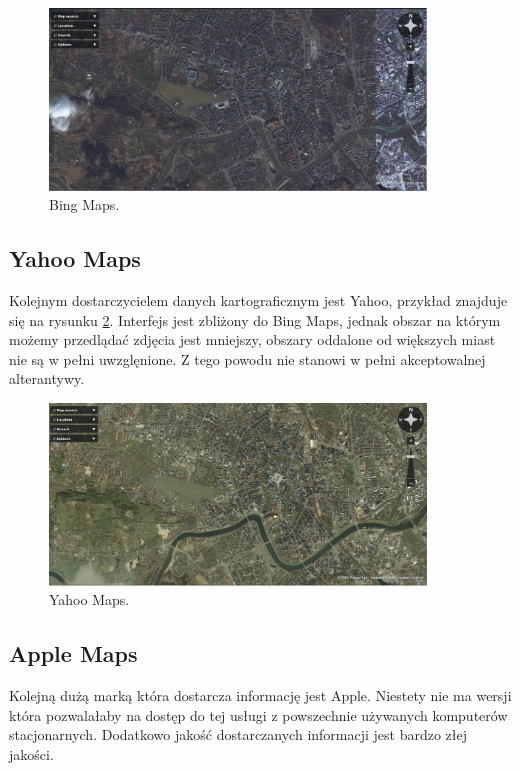 \begin{figure}[H]
  \centering
    \includegraphics[width=100mm]{ge/bing_1.jpg}
  \caption{Bing Maps.}
  \label{fig:bingMaps_1}
\end{figure}

\subsection{Yahoo Maps}
\label{subsec:Yahoo Maps}

Kolejnym dostarczycielem danych kartograficznym jest Yahoo, przykład znajduje się na rysunku \ref{fig:yahooMaps_1}. Interfejs jest zbliżony do Bing Maps, jednak obszar na którym możemy przedlądać zdjęcia jest mniejszy, obszary oddalone od większych miast nie są w pełni uwzglęnione. Z tego powodu nie stanowi w pełni akceptowalnej alterantywy.

\begin{figure}[H]
  \centering
    \includegraphics[width=100mm]{ge/yahoo_1.jpg}
  \caption{Yahoo Maps.}
  \label{fig:yahooMaps_1}
\end{figure}


\subsection{Apple Maps}
\label{subsec:Apple Maps}

Kolejną dużą marką która dostarcza informację jest Apple. Niestety nie ma wersji która pozwalałaby na dostęp do tej usługi z powszechnie używanych komputerów stacjonarnych. Dodatkowo jakość dostarczanych informacji jest bardzo złej jakości.

